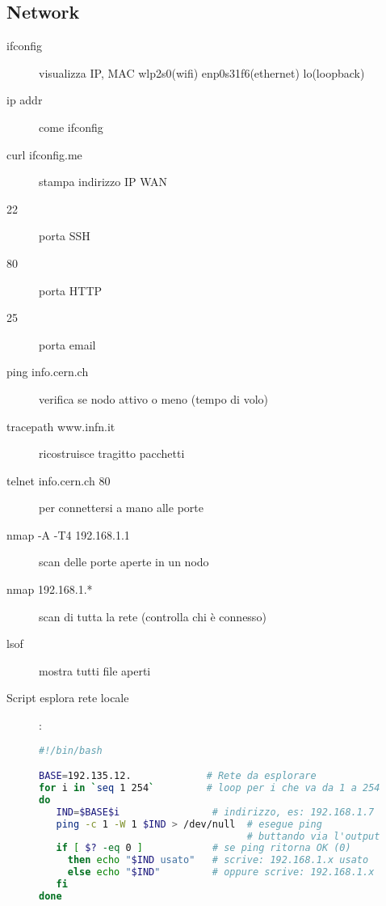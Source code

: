 \documentclass[a4paper, 12pt]{article}
\begin{document}
\subsection{Network}
\begin{description}
\item[ifconfig] visualizza IP, MAC wlp2s0(wifi) enp0s31f6(ethernet) lo(loopback)
\item[ip addr] come ifconfig
\item[curl ifconfig.me] stampa indirizzo IP WAN
\item[22] porta SSH
\item[80] porta HTTP
\item[25] porta email
\item[ping info.cern.ch] verifica se nodo attivo o meno (tempo di volo)
\item[tracepath www.infn.it] ricostruisce tragitto pacchetti
\item[telnet info.cern.ch 80] per connettersi a mano alle porte
\item[nmap -A -T4 192.168.1.1] scan delle porte aperte in un nodo
\item[nmap 192.168.1.*] scan di tutta la rete (controlla chi è connesso)
\item[lsof] mostra tutti file aperti
\item[Script esplora rete locale]:
\begin{lstlisting}[language = sh]
#!/bin/bash

BASE=192.135.12.             # Rete da esplorare  
for i in `seq 1 254`         # loop per i che va da 1 a 254
do
   IND=$BASE$i                # indirizzo, es: 192.168.1.7
   ping -c 1 -W 1 $IND > /dev/null  # esegue ping 
                                    # buttando via l'output
   if [ $? -eq 0 ]            # se ping ritorna OK (0)     
     then echo "$IND usato"   # scrive: 192.168.1.x usato
     else echo "$IND"         # oppure scrive: 192.168.1.x
   fi
done
\end{lstlisting}
\end{description}
\end{document}
